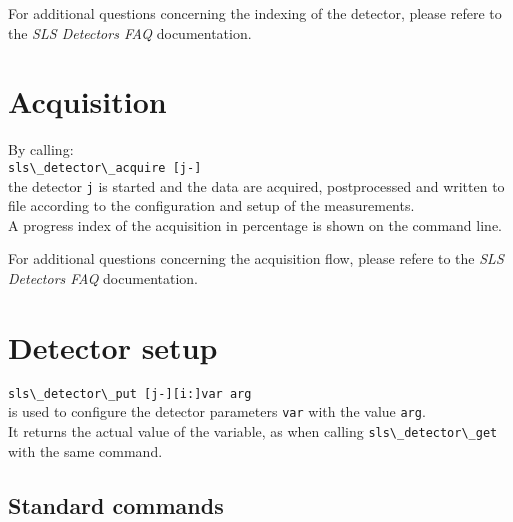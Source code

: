 \documentclass{article}
\begin{document}
For additional questions concerning the indexing of the detector, please refere to the \textit{SLS Detectors FAQ} documentation.


\section{Acquisition}





By calling:\\
\verb=sls\_detector\_acquire [j-]=\\
the detector \verb=j= is started and the data are acquired, postprocessed and written to file according to the configuration and setup of the measurements.\\
A progress index of the acquisition in percentage is shown on the command line.

For additional questions concerning the acquisition flow, please refere to the \textit{SLS Detectors FAQ} documentation.

\section{Detector setup}

\verb=sls\_detector\_put [j-][i:]var arg=\\

is used to configure the detector parameters \verb=var= with the value \verb=arg=.\\
It returns the actual value of the variable, as when calling \verb=sls\_detector\_get= with the same command.

\subsection{Standard commands}
\end{document}
